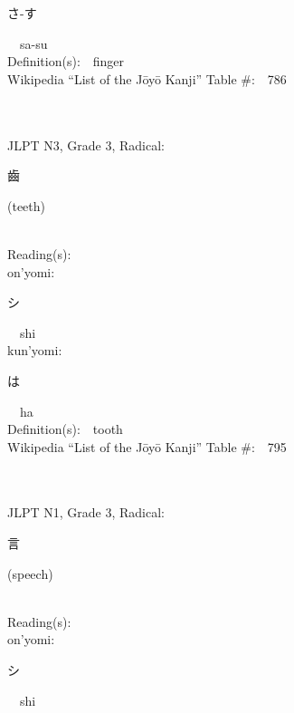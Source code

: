 \begin{multicols}{2}
{\hspace*{2em}}{\begin{CJK}{UTF8}{min} さ-す \end{CJK}}\ \ sa-su\ \ \\
Definition(s):\ \ finger \\
Wikipedia ``List of the J\=oy\=o Kanji'' Table \#:\ \ 786 \\
\ \ \\
{\fontsize{34pt}{40pt}  }\ \ \\  %
{JLPT N3, Grade 3, Radical:\ \ {\begin{CJK}{UTF8}{min} 齒 \end{CJK}} (teeth) } \\
Reading(s):\ \ \\
{\hspace*{1em}}on'yomi:\ \ \\
{\hspace*{2em}}{\begin{CJK}{UTF8}{min} シ \end{CJK}}\ \ shi\ \ \\
{\hspace*{1em}}kun'yomi:\ \ \\
{\hspace*{2em}}{\begin{CJK}{UTF8}{min} は \end{CJK}}\ \ ha\ \ \\
Definition(s):\ \ tooth \\
Wikipedia ``List of the J\=oy\=o Kanji'' Table \#:\ \ 795 \\
\ \ \\
{\fontsize{34pt}{40pt}  }\ \ \\  %
{JLPT N1, Grade 3, Radical:\ \ {\begin{CJK}{UTF8}{min} 言 \end{CJK}} (speech) } \\
Reading(s):\ \ \\
{\hspace*{1em}}on'yomi:\ \ \\
{\hspace*{2em}}{\begin{CJK}{UTF8}{min} シ \end{CJK}}\ \ shi\ \ \\

\end{multicols}
